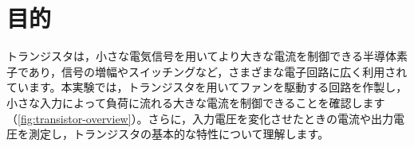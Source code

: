 \graphicspath{{contents/04_transistor/figures/}}


\section{目的}

トランジスタは，小さな電気信号を用いてより大きな電流を制御できる半導体素子であり，信号の増幅やスイッチングなど，さまざまな電子回路に広く利用されています。本実験では，トランジスタを用いてファンを駆動する回路を作製し，小さな入力によって負荷に流れる大きな電流を制御できることを確認します（\cref{fig:transistor-overview}）。さらに，入力電圧を変化させたときの電流や出力電圧を測定し，トランジスタの基本的な特性について理解します。

